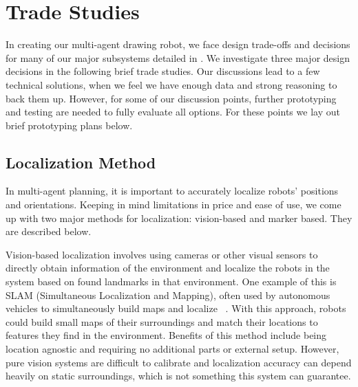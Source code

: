 
\section{Trade Studies}
\label{sec:trade_studies}

In creating our multi-agent drawing robot, we face design trade-offs and decisions for many of our major subsystems detailed in . We investigate three major design decisions in the following brief trade studies. Our discussions lead to a few technical solutions, when we feel we have enough data and strong reasoning to back them up. However, for some of our discussion points, further prototyping and testing are needed to fully evaluate all options. For these points we lay out brief prototyping plans below. 

\subsection{Localization Method}
\label{sec:trade_localization}
In multi-agent planning, it is important to accurately localize robots' positions and orientations. Keeping in mind limitations in price and ease of use, we come up with two major methods for localization: vision-based and marker based. They are described below.

Vision-based localization involves using cameras or other visual sensors to directly obtain information of the environment and localize the robots in the system based on found landmarks in that environment. One example of this is SLAM (Simultaneous Localization and Mapping), often used by autonomous vehicles to simultaneously build maps and localize ~\cite{dissanayake2001solution}. With this approach, robots could build small maps of their surroundings and match their locations to features they find in the environment. Benefits of this method include being location agnostic and requiring no additional parts or external setup. However, pure vision systems are difficult to calibrate and localization accuracy can depend heavily on static surroundings, which is not something this system can guarantee.


